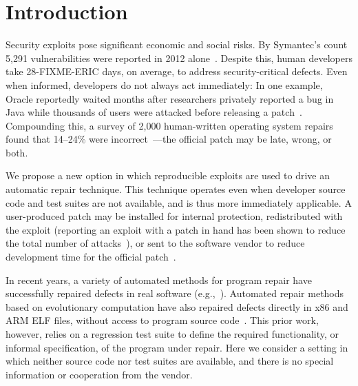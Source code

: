 \documentclass{sigcomm-alternate}
\begin{document}
\section{Introduction}
\label{sec-1}
Security exploits pose significant economic and social risks. By Symantec's
count 5,291 vulnerabilities were reported in 2012
alone~\cite{symantec2013threat}. Despite this, human developers take
28-FIXME-ERIC days, on average, to address security-critical defects. Even
when informed, developers do not always act immediately:  In one example,
Oracle reportedly waited months after researchers privately reported a bug
in Java while thousands of users were attacked before releasing a
patch~\cite{greenberg2012oracle}.  Compounding this, a survey of 2,000
human-written operating system repairs found that 14--24\% were
incorrect~\cite{fixes-become-bugs}---the official patch may be late, wrong,
or both.  

We propose a new option in which reproducible exploits are used to drive an
automatic repair technique. This technique operates even when developer
source code and test suites are not available, and is thus more immediately
applicable. A user-produced patch may be installed for internal protection,
redistributed with the exploit (reporting an exploit with a patch in hand
has been shown to reduce the total number of attacks~\cite{arora2006does}),
or sent to the software vendor to reduce development time for the official
patch~\cite{weimer06}.

In recent years, a variety of automated methods for program repair have 
successfully repaired defects in real software
(e.g.,~\cite{clearview,genprog-tse-journal,par,nguyen2013semfix}).
Automated repair methods based on evolutionary computation have also
repaired defects directly in x86 and ARM ELF files, without access to
program source code~\cite{schulte2013embedded}.  This prior work,
however, relies on a regression test suite to define the required
functionality, or informal specification, of the program under repair.
Here we consider a setting in which neither source code nor test
suites are available, and there is no special information or
cooperation from the vendor.  
\end{document}

